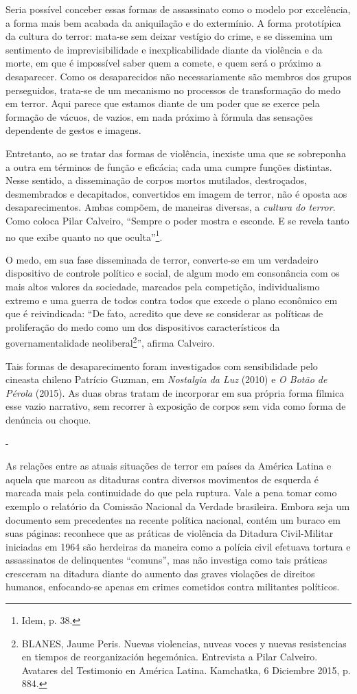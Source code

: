 Seria possível conceber essas formas de assassinato como o modelo por
excelência, a forma mais bem acabada da aniquilação e do extermínio. A
forma prototípica da cultura do terror: mata-se sem deixar vestígio do
crime, e se dissemina um sentimento de imprevisibilidade e
inexplicabilidade diante da violência e da morte, em que é impossível
saber quem a comete, e quem será o próximo a desaparecer. Como os
desaparecidos não necessariamente são membros dos grupos perseguidos,
trata-se de um mecanismo no processos de transformação do medo em
terror. Aqui parece que estamos diante de um poder que se exerce pela
formação de vácuos, de vazios, em nada próximo à fórmula das sensações
dependente de gestos e imagens.

Entretanto, ao se tratar das formas de violência, inexiste uma que se
sobreponha a outra em términos de função e eficácia; cada uma cumpre
funções distintas. Nesse sentido, a disseminação de corpos mortos
mutilados, destroçados, desmembrados e decapitados, convertidos em
imagem de terror, não é oposta aos desaparecimentos. Ambas compõem, de
maneiras diversas, a \emph{cultura do terror}. Como coloca Pilar
Calveiro, ``Sempre o poder mostra e esconde. E se revela tanto no que
exibe quanto no que oculta''\footnote{Idem, p. 38.}.

O medo, em sua fase disseminada de terror, converte-se em um verdadeiro
dispositivo de controle político e social, de algum modo em consonância
com os mais altos valores da sociedade, marcados pela competição,
individualismo extremo e uma guerra de todos contra todos que excede o
plano econômico em que é reivindicada: ``De fato, acredito que deve se
considerar as políticas de proliferação do medo como um dos dispositivos
característicos da governamentalidade neoliberal\footnote{BLANES, Jaume
  Peris. Nuevas violencias, nuveas voces y nuevas resistencias en
  tiempos de reorganización hegemónica. Entrevista a Pilar Calveiro.
  Avatares del Testimonio en América Latina. Kamchatka, 6 Diciembre
  2015, p. 884.}'', afirma Calveiro.

Tais formas de desaparecimento foram investigados com sensibilidade pelo
cineasta chileno Patrício Guzman, em \emph{Nostalgia da Luz} (2010) e
\emph{O Botão de Pérola} (2015). As duas obras tratam de incorporar em
sua própria forma fílmica esse vazio narrativo, sem recorrer à exposição
de corpos sem vida como forma de denúncia ou choque.

-

As relações entre as atuais situações de terror em países da América
Latina e aquela que marcou as ditaduras contra diversos movimentos de
esquerda é marcada mais pela continuidade do que pela ruptura. Vale a
pena tomar como exemplo o relatório da Comissão Nacional da Verdade
brasileira. Embora seja um documento sem precedentes na recente política
nacional, contém um buraco em suas páginas: reconhece que as práticas de
violência da Ditadura Civil-Militar iniciadas em 1964 são herdeiras da
maneira como a polícia civil efetuava tortura e assassinatos de
delinquentes ``comuns'', mas não investiga como tais práticas cresceram
na ditadura diante do aumento das graves violações de direitos humanos,
enfocando-se apenas em crimes cometidos contra militantes políticos.

